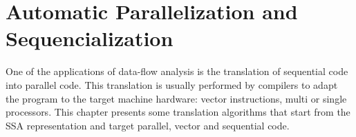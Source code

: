 \chapter{Automatic Parallelization and Sequencialization }
{}

One of the applications of data-flow analysis is the translation of
sequential code into parallel code.  This translation is usually
performed by compilers to adapt the program to the target machine
hardware: vector instructions, multi or single processors.  This
chapter presents some translation algorithms that start from the SSA
representation and target parallel, vector and sequential code.

